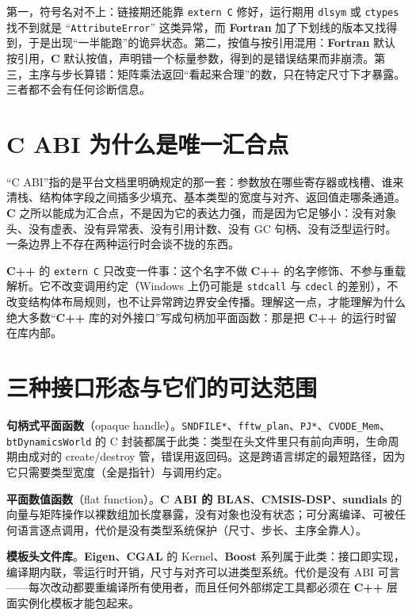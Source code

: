 \documentclass[12pt,a4paper,fontset=fandol]{ctexbook}
\newcommand{\Tp}[1]{\texttt{#1}}
\newcommand{\Bk}{\allowbreak}
\newcommand{\Lib}[1]{\textbf{#1}}
\newcommand{\Lang}[1]{\textsf{\bfseries #1}}
\newcommand{\CL}{\Lang{C}}
\newcommand{\CPP}{\Lang{C++}}
\newcommand{\FTN}{\Lang{Fortran}}
\begin{document}
\begin{warning}[title={跨语言边界的三种静默错位}]
第一，符号名对不上：链接期还能靠 \Tp{extern \textquotedbl C\textquotedbl} 修好，运行期用 \Tp{dlsym} 或 \Tp{ctypes} 找不到就是 ``\Tp{AttributeError}'' 这类异常，而 \FTN{} 加了下划线的版本又找得到，于是出现``一半能跑''的诡异状态。第二，按值与按引用混用：\FTN{} 默认按引用，\CL{} 默认按值，声明错一个标量参数，得到的是错误结果而非崩溃。第三，主序与步长算错：矩阵乘法返回``看起来合理''的数，只在特定尺寸下才暴露。三者都不会有任何诊断信息。
\end{warning}
\section{C ABI 为什么是唯一汇合点}

``C ABI''指的是平台文档里明确规定的那一套：参数放在哪些寄存器或栈槽、谁来清栈、结构体字段之间插多少填充、基本类型的宽度与对齐、返回值走哪条通道。\CL{} 之所以能成为汇合点，不是因为它的表达力强，而是因为它足够小：没有对象头、没有虚表、没有异常表、没有引用计数、没有 GC 句柄、没有泛型运行时。一条边界上不存在两种运行时会谈不拢的东西。

\CPP{} 的 \Tp{extern \textquotedbl C\textquotedbl} 只改变一件事：这个名字不做 \CPP{} 的名字修饰、不参与重载解析。它不改变调用约定（Windows 上仍可能是 \Tp{stdcall} 与 \Tp{cdecl} 的差别），不改变结构体布局规则，也不让异常跨边界安全传播。理解这一点，才能理解为什么绝大多数``\CPP{} 库的对外接口''写成句柄加平面函数：那是把 \CPP{} 的运行时留在库内部。

\section{三种接口形态与它们的可达范围}

\textbf{句柄式平面函数}（opaque handle）。\Tp{SNDFILE*}、\Tp{fftw\_plan}、\Tp{PJ*}、\Tp{CVODE\_Mem}、\Tp{bt{\Bk}Dynamics{\Bk}World} 的 C 封装都属于此类：类型在头文件里只有前向声明，生命周期由成对的 create/destroy 管，错误用返回码。这是跨语言绑定的最短路径，因为它只需要类型宽度（全是指针）与调用约定。

\textbf{平面数值函数}（flat function）。\Lib{C ABI 的 BLAS}、\Lib{CMSIS-DSP}、\Lib{sundials} 的向量与矩阵操作以裸数组加长度暴露，没有对象也没有状态；可分离编译、可被任何语言逐点调用，代价是没有类型系统保护（尺寸、步长、主序全靠人）。

\textbf{模板头文件库}。\Lib{Eigen}、\Lib{CGAL} 的 Kernel、\Lib{Boost} 系列属于此类：接口即实现，编译期内联，零运行时开销，尺寸与对齐可以进类型系统。代价是没有 ABI 可言——每次改动都要重编译所有使用者，而且任何外部绑定工具都必须在 \CPP{} 层面实例化模板才能包起来。
\end{document}
